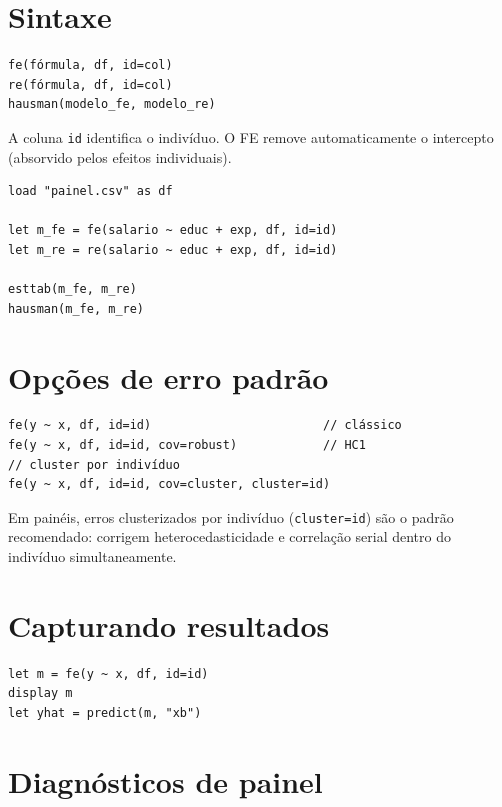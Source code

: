 \section{Sintaxe}

\begin{lstlisting}
fe(fórmula, df, id=col)
re(fórmula, df, id=col)
hausman(modelo_fe, modelo_re)
\end{lstlisting}

A coluna \lstinline{id} identifica o indivíduo. O FE remove automaticamente
o intercepto (absorvido pelos efeitos individuais).

\begin{lstlisting}[caption={Fluxo completo}]
load "painel.csv" as df

let m_fe = fe(salario ~ educ + exp, df, id=id)
let m_re = re(salario ~ educ + exp, df, id=id)

esttab(m_fe, m_re)
hausman(m_fe, m_re)
\end{lstlisting}

\section{Opções de erro padrão}

\begin{lstlisting}
fe(y ~ x, df, id=id)                        // clássico
fe(y ~ x, df, id=id, cov=robust)            // HC1
// cluster por indivíduo
fe(y ~ x, df, id=id, cov=cluster, cluster=id)
\end{lstlisting}

\begin{nota}
  Em painéis, erros clusterizados por indivíduo (\lstinline{cluster=id})
  são o padrão recomendado: corrigem heterocedasticidade e correlação serial
  dentro do indivíduo simultaneamente.
\end{nota}

\section{Capturando resultados}

\begin{lstlisting}
let m = fe(y ~ x, df, id=id)
display m
let yhat = predict(m, "xb")
\end{lstlisting}

\section{Diagnósticos de painel}

